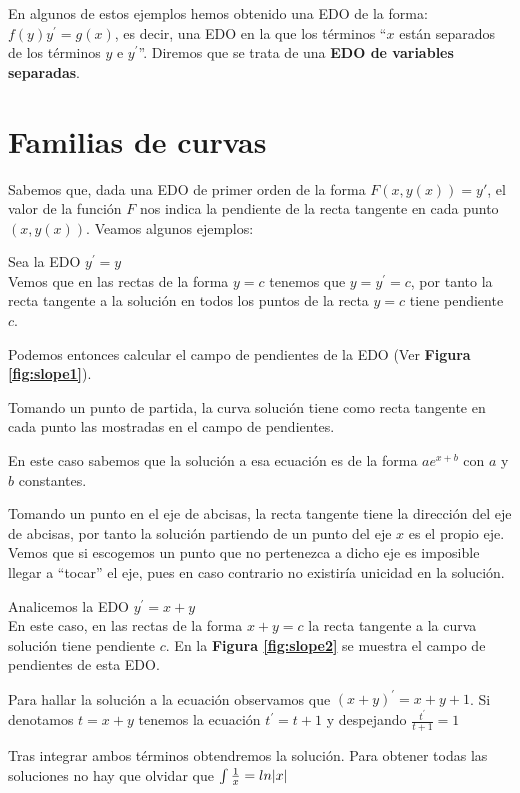 \documentclass{mathnotes}
\begin{document}
En algunos de estos ejemplos hemos obtenido una EDO de la forma: $f(y)y^\prime = g(x)$, es decir, una EDO en la que los términos ``$x$ están separados de los términos $y$ e $y^\prime$''. Diremos que se trata de una \textbf{EDO de variables separadas}. 
\section{Familias de curvas}

Sabemos que, dada una EDO de primer orden de la forma $F(x,y(x)) = y'$, el valor de la función $F$ nos indica la pendiente de la recta tangente en cada punto $(x, y(x))$.
Veamos algunos ejemplos:


\begin{example}
Sea la EDO $y^\prime = y$\\
Vemos que en las rectas de la forma $y=c$ tenemos que $y=y^\prime = c$, por tanto la recta tangente a la solución en todos los puntos de la recta $y=c$ tiene pendiente $c$.

Podemos entonces calcular el campo de pendientes de la EDO (Ver \textbf{Figura \ref{fig:slope1}}).

Tomando un punto de partida, la curva solución tiene como recta tangente en cada punto las mostradas en el campo de pendientes.

En este caso sabemos que la solución a esa ecuación es de la forma $ae^{x+b}$ con $a$ y $b$ constantes.

Tomando un punto en el eje de abcisas, la recta tangente tiene la dirección del eje de abcisas, por tanto la solución partiendo de un punto del eje $x$ es el propio eje. Vemos que si escogemos un punto que no pertenezca a dicho eje es imposible llegar a ``tocar'' el eje, pues en caso contrario no existiría unicidad en la solución.
\end{example}


\begin{example}
Analicemos la EDO $y^\prime = x+y$\\
En este caso, en las rectas de la forma $x+y=c$ la recta tangente a la curva solución tiene pendiente $c$.
En la \textbf{Figura \ref{fig:slope2}} se muestra el campo de pendientes de esta EDO.

Para hallar la solución a la ecuación observamos que $(x+y)^\prime = x+y+1$. Si denotamos $t=x+y$ tenemos la ecuación $t^\prime=t+1$ y despejando $\frac{t^\prime}{t+1} = 1$

Tras integrar ambos términos obtendremos la solución.
Para obtener todas las soluciones no hay que olvidar que $\int \frac{1}{x} = ln|x|$
\end{example}
\end{document}
